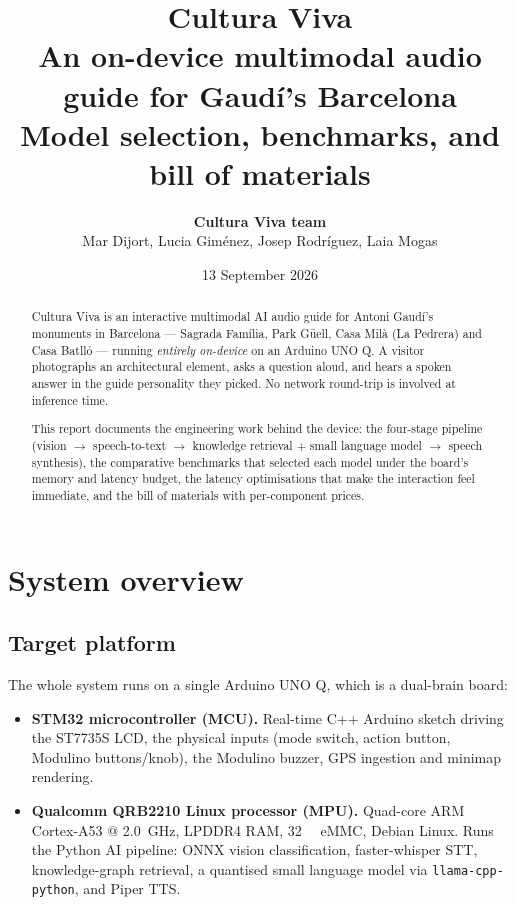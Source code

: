 \documentclass[11pt,a4paper]{article}
\title{\textbf{Cultura Viva}\\[0.3em]
\large An on-device multimodal audio guide for Gaud\'i's Barcelona\\
\normalsize Model selection, benchmarks, and bill of materials}
\author{
  \textbf{Cultura Viva team} \\
  Mar Dijort, Lucia Gim\'enez, Josep Rodr\'iguez, Laia Mogas
}
\date{13 September 2026}
\begin{document}
\maketitle

\begin{abstract}
\noindent
Cultura Viva is an interactive multimodal AI audio guide for Antoni Gaud\'i's
monuments in Barcelona --- Sagrada Fam\'ilia, Park G\"uell, Casa Mil\`a
(La Pedrera) and Casa Batll\'o --- running \emph{entirely on-device} on an
Arduino UNO Q. A visitor photographs an architectural element, asks a question
aloud, and hears a spoken answer in the guide personality they picked. No
network round-trip is involved at inference time.

This report documents the engineering work behind the device: the four-stage
pipeline (vision $\rightarrow$ speech-to-text $\rightarrow$ knowledge retrieval
$+$ small language model $\rightarrow$ speech synthesis), the comparative
benchmarks that selected each model under the board's memory and latency
budget, the latency optimisations that make the interaction feel immediate, and
the bill of materials with per-component prices.
\end{abstract}

\tableofcontents
\newpage

\section{System overview}

\subsection{Target platform}

The whole system runs on a single Arduino UNO Q, which is a dual-brain board:

\begin{itemize}
  \item \textbf{STM32 microcontroller (MCU).} Real-time C++ Arduino sketch
        driving the ST7735S LCD, the physical inputs (mode switch, action
        button, Modulino buttons/knob), the Modulino buzzer, GPS ingestion and
        minimap rendering.
  \item \textbf{Qualcomm QRB2210 Linux processor (MPU).} Quad-core ARM
        Cortex-A53 @ \SI{2.0}{\giga\hertz}, LPDDR4 RAM, \SI{32}{\giga\byte}
        eMMC, Debian Linux. Runs the Python AI pipeline: ONNX vision
        classification, faster-whisper STT, knowledge-graph retrieval, a
        quantised small language model via
        \texttt{llama-cpp-\discretionary{}{}{}python}, and Piper TTS.
\end{itemize}
\end{document}
